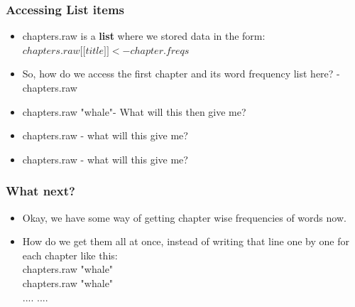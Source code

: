 \documentclass{beamer}
\begin{document}
\begin{frame}
\frametitle{Accessing List items}
\begin{itemize}
\item chapters.raw is a \textbf{list} where we stored data in the form: $chapters.raw\lbrack \lbrack title \rbrack\rbrack <- chapter.freqs$
\item So, how do we access the first chapter and its word frequency list here? - chapters.raw \lbrack {}\rbrack\rbrack
\item chapters.raw \lbrack {}\rbrack \rbrack \lbrack"whale"\rbrack - What will this then give me? \pause
\item chapters.raw \lbrack {}\rbrack \rbrack {}\rbrack - what will this give me? \pause
\item chapters.raw \lbrack {}\rbrack \rbrack \lbrack {}\rbrack \rbrack - what will this give me? \pause
\end{itemize}
\end{frame}

\begin{frame}
\frametitle{What next?}
\begin{itemize}
\item Okay, we have some way of getting chapter wise frequencies of words now. 
\item How do we get them all at once, instead of writing that line one by one for each chapter like this: 
\\ chapters.raw \lbrack {}\rbrack \rbrack \lbrack"whale"\rbrack
\\ chapters.raw \lbrack {}\rbrack \rbrack \lbrack"whale"\rbrack
\\ .... .... 
\end{itemize}
\end{frame}
\end{document}
